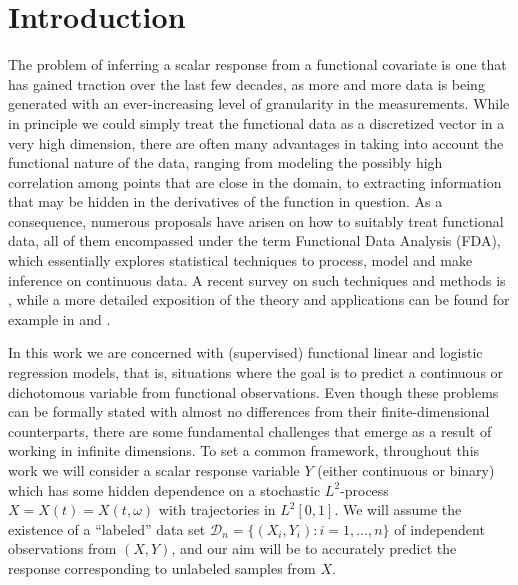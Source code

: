 \documentclass[ba]{imsart}
\numberwithin{equation}{section}
\theoremstyle{plain}
\begin{document}
\section{Introduction}\label{sec:intro}

The problem of inferring a scalar response from a functional covariate is one that has gained traction over the last few decades, as more and more data is being generated with an ever-increasing level of granularity in the measurements. While in principle we could simply treat the functional data as a discretized vector in a very high dimension, there are often many advantages in taking into account the functional nature of the data, ranging from modeling the possibly high correlation among points that are close in the domain, to extracting information that may be hidden in the derivatives of the function in question. As a consequence, numerous proposals have arisen on how to suitably treat functional data, all of them encompassed under the term Functional Data Analysis (FDA), which essentially explores statistical techniques to process, model and make inference on continuous data. A recent survey on such techniques and methods is \citet{cuevas2014partial}, while a more detailed exposition of the theory and applications can be found for example in \citet{hsing2015theoretical} and \citet{horváth2012inference}.

In this work we are concerned with (supervised) functional linear and logistic regression models, that is, situations where the goal is to predict a continuous or dichotomous variable from functional observations. Even though these problems can be formally stated with almost no differences from their finite-dimensional counterparts, there are some fundamental challenges that emerge as a result of working in infinite dimensions. To set a common framework, throughout this work we will consider a scalar response variable \(Y\) (either continuous or binary) which has some hidden dependence on a stochastic \(L^2\)-process \(X=X(t)=X(t, \omega)\) with trajectories in \(L^2[0, 1]\). We will assume the existence of a ``labeled'' data set \(\mathcal D_n =\{(X_i, Y_i): i=1,\dots, n\}\) of independent observations from \((X, Y)\), and our aim will be to accurately predict the response corresponding to unlabeled samples from \(X\).
\end{document}
